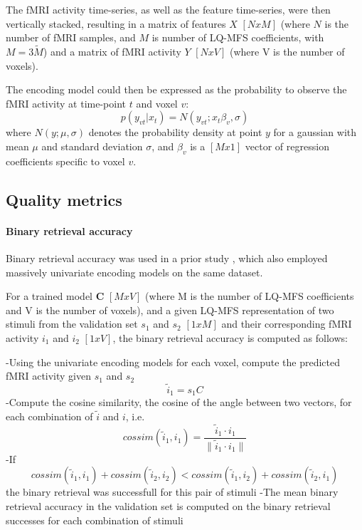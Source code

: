 The f{MRI} activity time-series, as well as the feature time-series, were then vertically stacked, resulting in a matrix of features $X$ $[NxM]$ (where $N$ is the number of f{MRI} samples, and $M$ is number of LQ-MFS coefficients, with $M=3\widetilde{M}$) and a matrix of f{MRI} activity $Y$ $[NxV]$ (where V is the number of voxels).

The encoding model could then be expressed as the probability to observe the f{MRI} activity at time-point $t$ and voxel $v$:
\begin{equation}\label{eq:encmo}
p(y_{vt}|x_{t}) = N(y_{vt};x_{t}\beta_{v},\sigma) \end{equation} where $N(y;\mu,\sigma)$ denotes the probability density at point $y$ for a gaussian with mean $\mu$ and standard deviation $\sigma$, and $\beta_{v}$ is a $[Mx1]$ vector of regression coefficients specific to voxel $v$.  \subsection*{Quality metrics} 

\paragraph{Binary retrieval accuracy}

Binary retrieval accuracy \cite{ML08} was used in a prior study \cite{CTK+2012}, which also employed massively univariate encoding models on the same dataset.

For a trained model $\mathbf{C}$ $[M x V]$ (where M is the number of LQ-MFS coefficients and V is the number of voxels), and a given LQ-MFS representation of two stimuli from the validation set $s_{1}$ and $s_{2}$ $[1 x M]$ and their corresponding f{MRI} activity $i_{1}$ and $i_{2}$ $[ 1 x V ]$, the binary retrieval accuracy is computed as follows:

-Using the univariate encoding models for each voxel, compute the predicted f{MRI} activity given $s_{1}$ and $s_{2}$ 
\begin{equation}\label{eq:predict}
\widetilde{i}_{1} = s_{1}C
\end{equation}
-Compute the cosine similarity, the cosine of the angle between two vectors, for each combination of $\widetilde{i}$ and $i$, i.e.
\[ cossim(\widetilde{i}_{1},i_{1}) =  \frac{\widetilde{i}_{1} \cdot i_{1}}{\|\widetilde{i}_{1} \cdot i_{1}\|} \] 
-If \[ cossim(\widetilde{i}_{1},i_{1})+cossim(\widetilde{i}_{2},i_{2}) < cossim(\widetilde{i}_{1},i_{2})+cossim(\widetilde{i}_{2},i_{1}) \] the binary retrieval was successfull for this pair of stimuli
-The mean binary retrieval accuracy in the validation set is computed on the binary retrieval successes for each combination of stimuli

